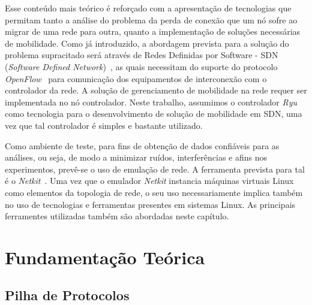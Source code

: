 \documentclass[	12pt, Times, openright, twoside, a4paper, english, brazil]{abntex2}
\begin{document}
Esse conteúdo mais teórico é reforçado com a apresentação de tecnologias que permitam tanto a análise do problema da perda de conexão que um nó sofre ao migrar de uma rede para outra, quanto a implementação de soluções necessárias de mobilidade. Como já introduzido, a abordagem prevista para a solução do problema supracitado será através de Redes Definidas por Software - SDN (\textit{Software Defined Network})~\cite{McKeown}, as quais necessitam do suporte do protocolo \textit{OpenFlow}~\cite{McKeown} para comunicação dos equipamentos de interconexão com o controlador da rede. A solução de gerenciamento de mobilidade na rede requer ser implementada no nó controlador. Neste trabalho, assumimos o controlador \textit{Ryu} como tecnologia para o desenvolvimento de solução de mobilidade em SDN, uma vez que tal controlador é simples e bastante utilizado.

Como ambiente de teste, para fins de obtenção de dados confiáveis para as análises, ou seja, de modo a minimizar ruídos, interferências e afins nos experimentos, prevê-se o uso de emulação de rede. A ferramenta prevista para tal é o \textit{Netkit}~\cite{Pizzonia}. Uma vez que o emulador \textit{Netkit} instancia máquinas virtuais Linux como elementos da topologia de rede, o seu uso necessariamente 
implica também no uso de tecnologias e ferramentas presentes em sistemas Linux. As principais ferramentes utilizadas também são abordadas neste capítulo.

\section{Fundamentação Teórica}
\label{sec:fundamentos}

\subsection{Pilha de Protocolos}

\end{document}
